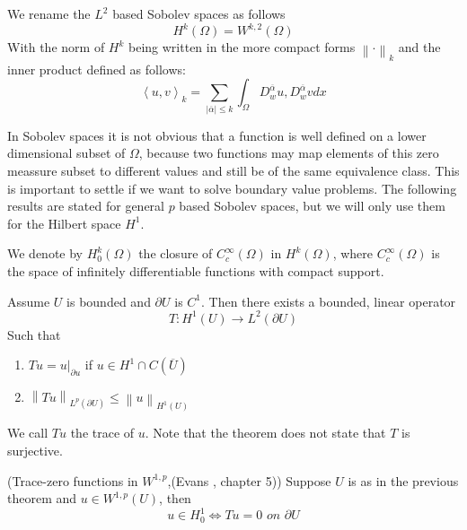 \documentclass[../Main/main.tex]{subfiles}
\begin{document}
	\begin{definition}
		We rename the $L^2$ based Sobolev spaces as follows 
		\begin{equation*}
			H^k(\Omega) = W^{k,2}(\Omega)
		\end{equation*}
		With the norm of $H^k$ being written in the more compact forms $\left \| \cdot \right \|_k$ and the inner product defined as follows:
		\begin{equation*}
			\left \langle u,v \right \rangle_k = \sum_{|\overline{\alpha}| \leq k} \int_{\Omega}D_w^{\overline{\alpha}}u,D_w^{\overline{\alpha}}v dx
		\end{equation*}
	\end{definition}

	In Sobolev spaces it is not obvious that a function is well defined on a lower dimensional subset of $\Omega$, because two functions may map elements of this zero meassure subset to different values and still be of the same equivalence class. This is important to settle if we want to solve boundary value problems. The following results are stated for general $p$ based Sobolev spaces, but we will only use them for the Hilbert space $H^1$.
	\begin{definition}
		We denote by $H_0^{k}(\Omega)$ the closure of $C_c^{\infty}(\Omega)$ in $H^{k}(\Omega)$, where $C_c^{\infty}(\Omega)$ is the space of infinitely differentiable functions with compact support.
	\end{definition}
	\begin{theorem}
		Assume $U$ is bounded and $\partial U$ is $C^1$. Then there exists a bounded, linear operator
		\begin{equation*}
			T: H^{1}(U) \rightarrow L^2(\partial U)
		\end{equation*}
		Such that
		\begin{enumerate}
			\item $ Tu = u|_{\partial u} $ if $u\in H^{1}\cap C(\overline{U})$
			\item $\left \|Tu\right\|_{L^p(\partial U)}\leq \left \| u \right \|_{H^{1}(U)}$
		\end{enumerate}
	\end{theorem}
	We call $Tu$ the trace of $u$. Note that the theorem does not state that $T$ is surjective.
	\begin{theorem}(Trace-zero functions in $W^{1,p}$,(Evans \cite{evans10}, chapter 5))
		Suppose $U$ is as in the previous theorem and $u\in W^{1,p}(U)$, then
		\begin{equation*}
			u\in H^{1}_0 \Leftrightarrow  Tu=0 \textit{ on }\partial U
		\end{equation*}
	\end{theorem}
	
\end{document}
